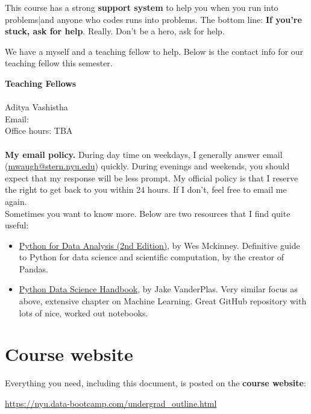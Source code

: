 This course has a strong {\bf support system\/} to help you when you run into problems|and anyone who codes runs into problems. The bottom line:  {\bf If you're stuck, ask for help\/}.
Really.  Don't be a hero, ask for help.

We have a myself and a teaching fellow to help. Below is the contact info for our teaching fellow this semester.

\textbf{Teaching Fellows}\\
\\
Aditya Vashistha  \\
Email: \\
Office hours: TBA\\
\\
\textbf{My email policy.} During day time on weekdays, I generally answer email (\href{mailto:mwaugh@stern.nyu.edu}{mwaugh@stern.nyu.edu}) quickly. During evenings and weekends, you should expect that my response will be less prompt. My official policy is that I reserve the right to get back to you within 24 hours. If I don't, feel free to email me again.\\

Sometimes you want to know more. Below are two resources that I find quite useful:
\begin{itemize}
\item \href{https://www.amazon.com/Python-Data-Analysis-Wrangling-IPython/dp/1491957662/}{Python for Data Analysis (2nd Edition)}, by Wes Mckinney. Definitive guide to Python for data science and scientific computation, by the creator of Pandas.
\item \href{https://www.amazon.com/Python-Data-Science-Handbook-Essential/dp/1491912057/}{Python Data Science Handbook}, by Jake VanderPlas. Very similar focus as above, extensive chapter on Machine Learning. Great GitHub repository with lots of nice, worked out notebooks.
\end{itemize}


\section*{Course website}

Everything you need, including this document, is posted on
the {\bf course website\/}:
%
\vspace{-0.15in}
\begin{center}
\url{https://nyu.data-bootcamp.com/undergrad_outline.html}
\end{center}
\vspace{-0.15in}

